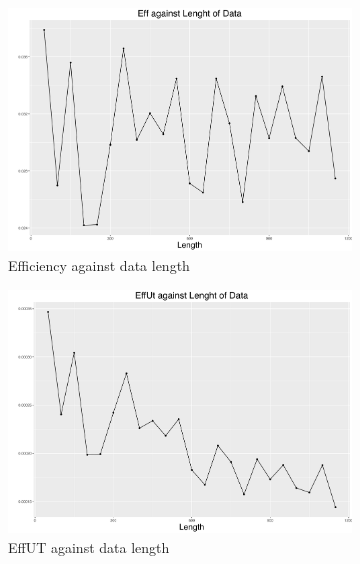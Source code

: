 \begin{figure}[h]
\centering
\begin{subfigure}[t]{0.45\textwidth}
    \includegraphics[width=\textwidth]{Chapters/05MCMCOU/plots/simudataOUlengtheff.pdf}
    \caption{Efficiency against data length}
\end{subfigure}
\begin{subfigure}[t]{0.45\textwidth}
    \includegraphics[width=\textwidth]{Chapters/05MCMCOU/plots/simudataOUlengtheffut.pdf}
    \caption{EffUT against data length}
\end{subfigure}
\begin{subfigure}[t]{0.45\textwidth}

\end{subfigure}
\end{figure}
